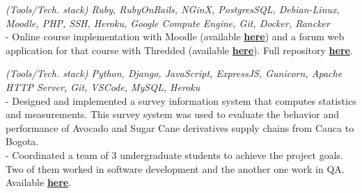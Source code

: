 \documentclass[]{CV-JuanCamiloFlorez}
\begin{document}
\begin{minipage}[t]{0.66\textwidth}
    \focusareas{}
    \textit{(Tools/Tech. stack) Ruby, RubyOnRails, NGinX, PostgresSQL, Debian-Linux, Moodle, PHP, SSH, Heroku, Google Compute Engine, Git, Docker, Rancker} \\
        - Online course implementation with Moodle (available \textbf{\href{https://gitlab.com/VanJFlorez/animal_modeling_ethics/tree/master/docs/4 LMS build}{here}}) and a forum web application for that course with Thredded (available \textbf{\href{https://gitlab.com/VanJFlorez/animal_modeling_ethics/blob/master/docs/3\%20Social\%20WebApp/CP\%20etica\%20animal\%20webApp.pdf}{here}}). Full repository \textbf{\href{https://gitlab.com/VanJFlorez/animal_modeling_ethics/}{here}}. \\
        \sectionsep

    \focusareas{}
    \textit{(Tools/Tech. stack) Python, Django, JavaScript, ExpressJS, Gunicorn, Apache HTTP Server, Git, VSCode, MySQL, Heroku} \\
        - Designed and implemented a survey information system that computes statistics and measurements. This survey system was used to evaluate the behavior and performance of Avocado and Sugar Cane derivatives supply chains from Cauca to Bogota. \\
        - Coordinated a team of 3 undergraduate students to achieve the project goals. Two of them worked in software development and the another one work in QA. Available \textbf{\href{https://gitlab.com/VanJFlorez/sepro-webapp}{here}}. \\
        \sectionsep

 
\vspace{\topsep} %





\end{minipage}
\end{document}
